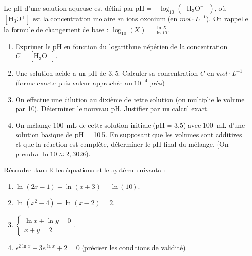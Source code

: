 \documentclass[11pt]{article}
\begin{document}
\begin{exercice}
Le pH d'une solution aqueuse est défini par $\text{pH} = -\log_{10}([\mathrm{H_3O^+}])$, où $[\mathrm{H_3O^+}]$ est la concentration molaire en ions oxonium (en $\si{mol\cdot L^{-1}}$). On rappelle la formule de changement de base : $\log_{10}(X) = \frac{\ln X}{\ln 10}$.
\begin{enumerate}
    \item Exprimer le pH en fonction du logarithme népérien de la concentration $C = [\mathrm{H_3O^+}]$.
    \item Une solution acide a un pH de $3,5$. Calculer sa concentration $C$ en $\si{mol\cdot L^{-1}}$ (forme exacte puis valeur approchée au $10^{-4}$ près).
    \item On effectue une dilution au dixième de cette solution (on multiplie le volume par 10). Déterminer le nouveau pH. Justifier par un calcul exact.
    \item On mélange \SI{100}{mL} de cette solution initiale (pH = 3,5) avec \SI{100}{mL} d'une solution basique de pH = 10,5. En supposant que les volumes sont additives et que la réaction est complète, déterminer le pH final du mélange. (On prendra $\ln 10 \approx 2,3026$).
\end{enumerate}
\end{exercice}

\begin{exercice}
Résoudre dans $\mathbb{R}$ les équations et le système suivants :
\begin{enumerate}
    \item $\ln(2x-1) + \ln(x+3) = \ln(10)$.
    \item $\ln(x^2 - 4) - \ln(x-2) = 2$.
    \item $\begin{cases} \ln x + \ln y = 0 \\ x + y = 2 \end{cases}$.
    \item $e^{2\ln x} - 3e^{\ln x} + 2 = 0$ (préciser les conditions de validité).
\end{enumerate}
\end{exercice}
\end{document}
